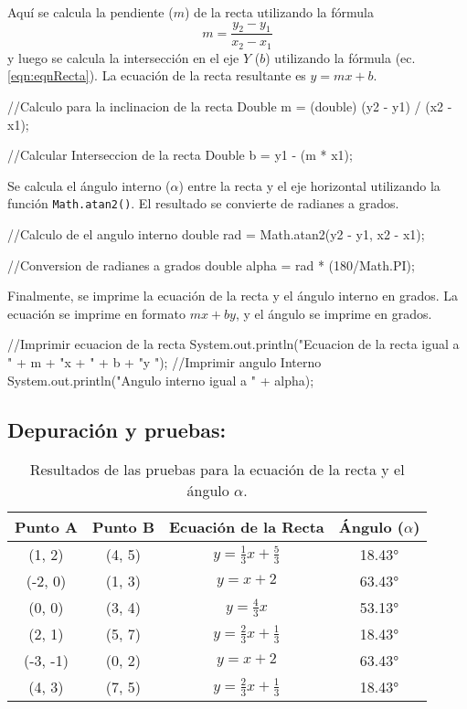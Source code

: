 Aquí se calcula la pendiente (\(m\)) de la recta utilizando la fórmula
\[
m = \frac{{y_2 - y_1}}{{x_2 - x_1}}
\]
y luego se calcula la intersección en el eje \(Y\) (\(b\)) utilizando la fórmula (ec. \ref{eqn:eqnRecta}). La ecuación de la recta resultante es \(y = mx + b\).

    \begin{javaCode}
        //Calculo para la inclinacion de la recta
        Double m = (double) (y2 - y1) / (x2 - x1);
        
        //Calcular Interseccion de la recta
        Double b = y1 - (m * x1);
    \end{javaCode}

Se calcula el ángulo interno (\(\alpha\)) entre la recta y el eje horizontal utilizando la función \texttt{Math.atan2()}. El resultado se convierte de radianes a grados.

    \begin{javaCode}
        //Calculo de el angulo interno
        double rad = Math.atan2(y2 - y1, x2 - x1);
        
        //Conversion de radianes a grados
        double alpha = rad * (180/Math.PI);
    \end{javaCode}

Finalmente, se imprime la ecuación de la recta y el ángulo interno en grados. La ecuación se imprime en formato \(mx + by\), y el ángulo se imprime en grados.

    \begin{javaCode}
        //Imprimir ecuacion de la recta
        System.out.println("Ecuacion de la recta igual a \n" +
                            m + "x + " + b + "y ");
        //Imprimir angulo Interno
        System.out.println("Angulo interno igual a \n" + alpha);
    \end{javaCode}

\subsection{\textbf{Depuración y pruebas:}}
\begin{table}[h]
    \centering
    \begin{tabular}{|c|c|c|c|}
        \hline
        \textbf{Punto A} & \textbf{Punto B} & \textbf{Ecuación de la Recta} & \textbf{Ángulo (\(\alpha\))} \\
        \hline
        (1, 2) & (4, 5) & \(y = \frac{1}{3}x + \frac{5}{3}\) & 18.43° \\
        \hline
        (-2, 0) & (1, 3) & \(y = x + 2\) & 63.43° \\
        \hline
        (0, 0) & (3, 4) & \(y = \frac{4}{3}x\) & 53.13° \\
        \hline
        (2, 1) & (5, 7) & \(y = \frac{2}{3}x + \frac{1}{3}\) & 18.43° \\
        \hline
        (-3, -1) & (0, 2) & \(y = x + 2\) & 63.43° \\
        \hline
        (4, 3) & (7, 5) & \(y = \frac{2}{3}x + \frac{1}{3}\) & 18.43° \\
        \hline
    \end{tabular}
    \caption{Resultados de las pruebas para la ecuación de la recta y el ángulo \(\alpha\).}
    \label{tab:pruebas}
\end{table}